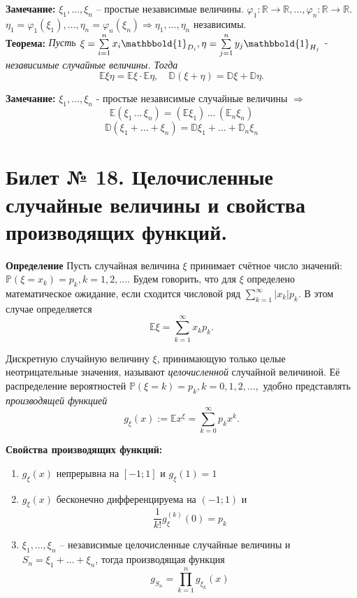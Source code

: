 	\textbf{Замечание:} $\xi_1, \ldots, \xi_n$ -- простые независимые величины. $\varphi_1: \mathbb{R} \rightarrow \mathbb{R}, \ldots, \varphi_n: \mathbb{R} \rightarrow \mathbb{R}$. $\eta_1 = \varphi_1(\xi_1), \ldots, \eta_n = \varphi_n(\xi_n) \Rightarrow \eta_1, \ldots, \eta_n$ независимы.\\
	
 	\textbf{Теорема:} \textit{Пусть $\xi = \sum\limits_{i = 1}^n x_i \mathbbold{1}_{D_i}, \eta = \sum\limits_{j = 1}^n y_j \mathbbold{1}_{H_j}  $ - независимые случайные величины. Тогда} 
	\[
	\mathbb{E}\xi \eta = \mathbb{E} \xi \cdot \mathbb{E} \eta, \quad \mathbb{D} (\xi + \eta) = \mathbb{D} \xi + \mathbb{D} \eta .
	\]
	
	\textbf{Замечание:} $\xi_1, ..., \xi_n$ - простые независимые случайные величины $\Rightarrow$\\
	\[
	\mathbb{E}(\xi_1 \,  ... \,  \xi_n) = (\mathbb{E}\xi_1) \, ... \,  (\mathbb{E}_n\xi_n)
	\]
	\[
	\mathbb{D}(\xi_1 + ... + \xi_n) = \mathbb{D}\xi_1 + ... + \mathbb{D}_n\xi_n
	\]
	
	\section{Билет № 18. Целочисленные случайные величины и свойства производящих функций.}
	\hspace{\parindent}\textbf{Определение} Пусть случайная величина $\xi$ принимает счётное число значений: $\mathbb{P}(\xi = x_k) = p_k, k = 1, 2, ... .$ Будем говорить, что для $\xi$ определено математическое ожидание, если сходится числовой ряд $\sum\limits_{k = 1}^\infty |x_k|p_k$. В этом случае определяется \\
	\[
	\mathbb{E} \xi = \sum\limits_{k = 1}^\infty x_k p_k.
	\]
	
	Дискретную случайную величину $\xi$, принимающую только целые неотрицательные значения, называют \textit{целочисленной} случайной величиной. Её распределение вероятностей $\mathbb{P}(\xi = k) = p_k, k = 0, 1, 2, ... ,$ удобно представлять \textit{производящей функцией}
	\[
	g_{\xi}(x) := \mathbb{E}x^{\xi} = \sum\limits_{k = 0}^\infty p_k x^k.
	\]
	
	\textbf{Свойства производящих функций:}
	\begin{enumerate}
	    \item $g_{\xi}(x)$ непрерывна на $[-1; 1]$ и $g_{\xi}(1) = 1$
	    \item $g_{\xi}(x)$ бесконечно дифференцируема на $(-1; 1)$ и 
	    \[\dfrac{1}{k!}g_{\xi}^{(k)}(0) = p_k \]
	    \item $\xi_1, \ldots, \xi_n$ -- независимые целочисленные случайные величины и $S_n = \xi_1 + \ldots + \xi_n$, тогда производящая функция
	    \[g_{S_n} = \prod_{k=1}^n g_{\xi_k}(x)\]
	\end{enumerate}
	
